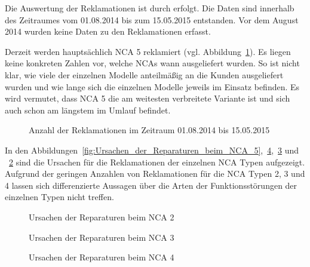 Die Auswertung der Reklamationen ist durch \cite{Guggemos2015} erfolgt. Die Daten sind innerhalb des Zeitraumes vom 01.08.2014 bis zum 15.05.2015 entstanden. Vor dem August 2014 wurden keine Daten zu den Reklamationen erfasst.

Derzeit werden hauptsächlich NCA 5 reklamiert (vgl. Abbildung~\ref{fig:Anzahl_der_Reparaturen}). Es liegen keine konkreten Zahlen vor, welche NCAs wann ausgeliefert wurden. So ist nicht klar, wie viele der einzelnen Modelle anteilmäßig an die Kunden ausgeliefert wurden und wie lange sich die einzelnen Modelle jeweils im Einsatz befinden. Es wird vermutet, dass NCA 5 die am weitesten verbreitete Variante ist und sich auch schon am längstem im Umlauf befindet.

\begin{figure}[H]

\caption{Anzahl der Reklamationen im Zeitraum 01.08.2014 bis 15.05.2015}
\label{fig:Anzahl_der_Reparaturen}
\end{figure}



In den Abbildungen~\ref{fig:Ursachen_der_Reparaturen_beim_NCA_5},~\ref{fig:Ursachen_der_Reparaturen_beim_NCA_4},~\ref{fig:Ursachen_der_Reparaturen_beim_NCA_3} und ~\ref{fig:Ursachen_der_Reparaturen_beim_NCA_2} sind die Ursachen für die Reklamationen der einzelnen NCA Typen aufgezeigt. Aufgrund der geringen Anzahlen von Reklamationen für die NCA Typen 2, 3 und 4 lassen sich differenzierte Aussagen über die Arten der Funktionsstörungen der einzelnen Typen nicht treffen.




\begin{figure}[H]

\caption{Ursachen der Reparaturen beim NCA 2}
\label{fig:Ursachen_der_Reparaturen_beim_NCA_2}
\end{figure}

\begin{figure}[H]

\caption{Ursachen der Reparaturen beim NCA 3}
\label{fig:Ursachen_der_Reparaturen_beim_NCA_3}
\end{figure}

\begin{figure}[H]

\caption{Ursachen der Reparaturen beim NCA 4}
\label{fig:Ursachen_der_Reparaturen_beim_NCA_4}
\end{figure}



